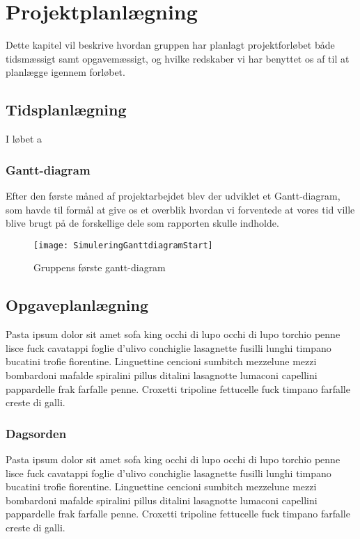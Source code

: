 \chapter{Projektplanlægning}\label{Projektplanlaegning}
Dette kapitel vil beskrive hvordan gruppen har planlagt projektforløbet både tidsmæssigt samt opgavemæssigt, og hvilke redskaber vi har benyttet os af til at planlægge igennem forløbet.

\section{Tidsplanlægning}\label{Tidsplanlaegning}
I løbet a



\subsection{Gantt-diagram}\label{Gantt-diagram}
Efter den første måned af projektarbejdet blev der udviklet et Gantt-diagram, som havde til formål at give os et overblik hvordan vi forventede at vores tid ville blive brugt på de forskellige dele som rapporten skulle indholde.

\begin{figure}[h]
\texttt{[image: SimuleringGanttdiagramStart]}
\centering
\caption{Gruppens første gantt-diagram}\label{Gantt-diagram-picture}
\end{figure}

\section{Opgaveplanlægning}\label{Opgaveplanlaegning}
Pasta ipsum dolor sit amet sofa king occhi di lupo occhi di lupo torchio penne lisce fuck cavatappi foglie d'ulivo conchiglie lasagnette fusilli lunghi timpano bucatini trofie fiorentine. Linguettine cencioni sumbitch mezzelune mezzi bombardoni mafalde spiralini pillus ditalini lasagnotte lumaconi capellini pappardelle frak farfalle penne. Croxetti tripoline fettucelle fuck timpano farfalle creste di galli.

\subsection{Dagsorden}\label{Dagsorden}
Pasta ipsum dolor sit amet sofa king occhi di lupo occhi di lupo torchio penne lisce fuck cavatappi foglie d'ulivo conchiglie lasagnette fusilli lunghi timpano bucatini trofie fiorentine. Linguettine cencioni sumbitch mezzelune mezzi bombardoni mafalde spiralini pillus ditalini lasagnotte lumaconi capellini pappardelle frak farfalle penne. Croxetti tripoline fettucelle fuck timpano farfalle creste di galli.

